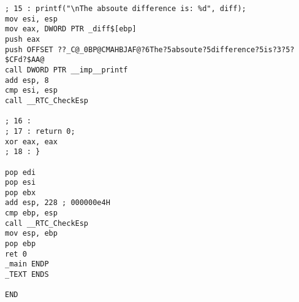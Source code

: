 \documentclass[a4paper,times]{article}
\begin{document}
\newpage
{\renewcommand\fcolorbox[4][]{\textcolor{black}{\strut#4}}
    \begin{verbatim}
; 15 : printf("\nThe absoute difference is: %d", diff);
mov esi, esp
mov eax, DWORD PTR _diff$[ebp]
push eax
push OFFSET ??_C@_0BP@CMAHBJAF@?6The?5absoute?5difference?5is?3?5?$CFd?$AA@
call DWORD PTR __imp__printf
add esp, 8
cmp esi, esp
call __RTC_CheckEsp

; 16 :
; 17 : return 0;
xor eax, eax
; 18 : }

pop edi
pop esi
pop ebx
add esp, 228 ; 000000e4H
cmp ebp, esp
call __RTC_CheckEsp
mov esp, ebp
pop ebp
ret 0
_main ENDP
_TEXT ENDS

END
    \end{verbatim}
    }
\end{document}
